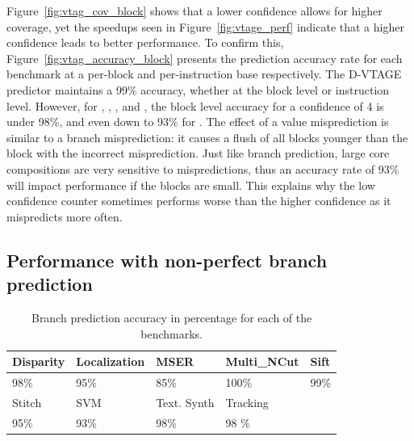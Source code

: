 Figure~\ref{fig:vtag_cov_block} shows that a lower confidence allows for higher coverage, yet the speedups seen in Figure~\ref{fig:vtage_perf} indicate that a higher confidence leads to better performance.
To confirm this, Figure~\ref{fig:vtag_accuracy_block} presents the prediction accuracy rate for each benchmark at a per-block and per-instruction base respectively.
The D-VTAGE predictor maintains a 99\% accuracy, whether at the block level or instruction level.
However, for , , ,  and , the block level accuracy for a confidence of 4 is under 98\%, and even down to 93\% for .
The effect of a value misprediction is similar to a branch misprediction: it causes a flush of all blocks younger than the block with the incorrect misprediction.
Just like branch prediction, large core compositions are very sensitive to mispredictions, thus an accuracy rate of 93\% will impact performance if the blocks are small.
This explains why the low confidence counter sometimes performs worse than the higher confidence as it mispredicts more often.

\subsection{Performance with non-perfect branch prediction}

\begin{table}[t]
  \small
  \centering
 \begin{tabular} { | l | l | l | l | l | }
 \hline
   \cellcolor[gray]{0.7}Disparity & \cellcolor[gray]{0.7} Localization& \cellcolor[gray]{0.7} MSER& \cellcolor[gray]{0.7} Multi\_NCut& \cellcolor[gray]{0.7} Sift\\ \hline
	98\%  & 95\% & 85\%  & 100\%& 99\%\\ \hline
	 \cellcolor[gray]{0.7} Stitch & \cellcolor[gray]{0.7} SVM & \cellcolor[gray]{0.7} Text. Synth & \cellcolor[gray]{0.7} Tracking&\\ \hline
	  95\%& 93\%& 98\%& 98 \%&\\ \hline
	\end{tabular}
  \caption{Branch prediction accuracy in percentage for each of the benchmarks.}\label{tab:sd-vbsbpred2}
  \vspace{-1em}
\end{table}

